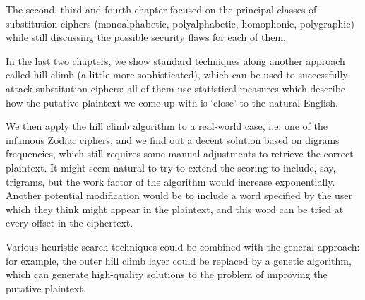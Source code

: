 \documentclass[Lau,binding=0.6cm,oneside]{sapthesis}
\begin{document}
The second, third and fourth chapter focused on the principal classes of substitution ciphers (monoalphabetic, polyalphabetic, homophonic, polygraphic) while still discussing the possible security flaws for each of them.

In the last two chapters, we show standard techniques along another approach called hill climb (a little more sophisticated), which can be used to successfully attack substitution ciphers: all of them use statistical measures which describe how the putative plaintext we come up with is `close' to the natural English.

We then apply the hill climb algorithm to a real-world case, i.e. one of the infamous Zodiac ciphers, and we find out a decent solution based on digrams frequencies, which still requires some manual adjustments to retrieve the correct plaintext. It might seem natural to try to extend the scoring to include, say, trigrams, but the work factor of the algorithm would increase exponentially. Another potential modification would be to include a word specified by the user which they think might appear in the plaintext, and this word can be tried at every offset in the ciphertext.

Various heuristic search techniques could be combined with the general approach: for example, the outer hill climb layer could be replaced by a genetic algorithm\supercite{geneticalgorithm}, which can generate high-quality solutions to the problem of improving the putative plaintext.
\end{document}
